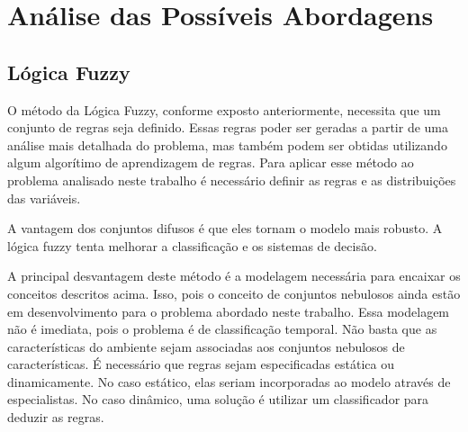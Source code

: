 \chapter{Análise das Possíveis Abordagens}\label{cap:anal_abordagens}




\section{Lógica Fuzzy}

O método da Lógica Fuzzy, conforme exposto anteriormente, necessita que um conjunto
de regras seja definido. Essas regras poder ser geradas a partir de uma análise mais
detalhada do problema, mas também podem ser obtidas utilizando algum algorítimo de
aprendizagem de regras. Para aplicar esse método ao problema analisado neste trabalho
é necessário definir as regras e as distribuições das variáveis.

A vantagem dos conjuntos difusos é que eles tornam o modelo mais robusto. A lógica fuzzy
tenta melhorar a classificação e os sistemas de decisão.

A principal desvantagem deste método é a modelagem necessária para encaixar os conceitos
descritos acima. Isso, pois o conceito de conjuntos nebulosos ainda estão em desenvolvimento
para o problema abordado neste trabalho. Essa modelagem não é imediata, pois o problema é de
classificação temporal. Não basta que as características do ambiente sejam associadas aos
conjuntos nebulosos de características. É necessário que regras sejam especificadas estática
ou dinamicamente. No caso estático, elas seriam incorporadas ao modelo através de especialistas.
No caso dinâmico, uma solução é utilizar um classificador para deduzir as regras.

